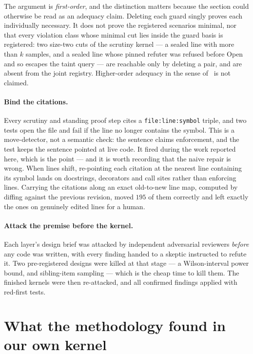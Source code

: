\documentclass[11pt,a4paper]{article}
\theoremstyle{plain}
\theoremstyle{definition}
\theoremstyle{remark}
\newcommand{\code}[1]{\texttt{#1}}
\begin{document}
The argument is \emph{first-order}, and the distinction matters because the section could otherwise be read as an adequacy claim. Deleting each guard singly proves each individually necessary. It does not prove the registered scenarios minimal, nor that every violation class whose minimal cut lies inside the guard basis is registered: two size-two cuts of the scrutiny kernel --- a sealed line with more than $k$ samples, and a sealed line whose pinned refuter was refused before Open and so escapes the taint query --- are reachable only by deleting a pair, and are absent from the joint registry. Higher-order adequacy in the sense of~\cite{higherorder} is not claimed.

\paragraph{Bind the citations.} Every scrutiny and standing proof step cites a \code{file:line:symbol} triple, and two tests open the file and fail if the line no longer contains the symbol. This is a move-detector, not a semantic check: the sentence claims enforcement, and the test keeps the sentence pointed at live code. It fired during the work reported here, which is the point --- and it is worth recording that the naive repair is wrong. When lines shift, re-pointing each citation at the nearest line containing its symbol lands on docstrings, decorators and call sites rather than enforcing lines. Carrying the citations along an exact old-to-new line map, computed by diffing against the previous revision, moved $195$ of them correctly and left exactly the ones on genuinely edited lines for a human.

\paragraph{Attack the premise before the kernel.} Each layer's design brief was attacked by independent adversarial reviewers \emph{before} any code was written, with every finding handed to a skeptic instructed to refute it. Two pre-registered designs were killed at that stage --- a Wilson-interval power bound, and sibling-item sampling --- which is the cheap time to kill them. The finished kernels were then re-attacked, and all confirmed findings applied with red-first tests.

\section{What the methodology found in our own kernel}
\label{sec:findings}
\end{document}
